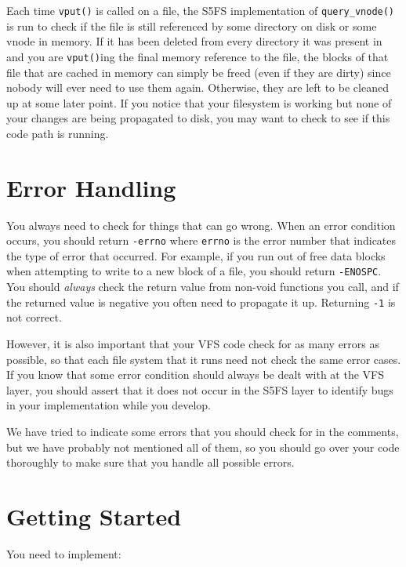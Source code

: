 Each time \texttt{vput()} is called on a file, the S5FS implementation of \texttt{query\_vnode()} is run to check if the file is still referenced by some directory on disk or some vnode in memory. If it has been deleted from every directory it was present in and you are \texttt{vput()}ing the final memory reference to the file, the blocks of that file that are cached in memory can simply be freed (even if they are dirty) since nobody will ever need to use them again. Otherwise, they are left to be cleaned up at some later point. If you notice that your filesystem is working but none of your changes are being propagated to disk, you may want to check to see if this code path is running.

\section{Error Handling}
\label{S5FS Error Handling}

You always need to check for things that can go wrong. When an error condition occurs, you should return \texttt{-errno} where \texttt{errno} is the error number that indicates the type of error that occurred. For example, if you run out of free data blocks when attempting to write to a new block of a file, you should return \texttt{-ENOSPC}. You should \emph{always} check the return value from non-void functions you call, and if the returned value is negative you often need to propagate it up. Returning \texttt{-1} is not correct.

However, it is also important that your VFS code check for as many errors as possible, so that each file system that it runs need not check the same error cases. If you know that some error condition should always be dealt with at the VFS layer, you should assert that it does not occur in the S5FS layer to identify bugs in your implementation while you develop.

We have tried to indicate some errors that you should check for in the comments, but we have probably not mentioned all of them, so you should go over your code thoroughly to make sure that you handle all possible errors.

\section{Getting Started}

You need to implement:

